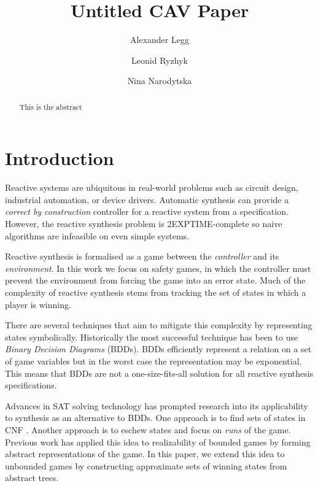 \documentclass{llncs}
\begin{document}
\title{Untitled CAV Paper}

\author{Alexander Legg 
    \and Leonid Ryzhyk
    \and Nina Narodytska}


\maketitle

\begin{abstract}
    This is the abstract
\end{abstract}

\section{Introduction}

Reactive systems are ubiquitous in real-world problems such as circuit design,
industrial automation, or device drivers. Automatic synthesis can provide a
\emph{correct by construction} controller for a reactive system from a
specification.  However, the reactive synthesis problem is 2EXPTIME-complete so
naive algorithms are infeasible on even simple systems.

Reactive synthesis is formalised as a game between the \emph{controller} and
its \emph{environment}. In this work we focus on safety games, in which the
controller must prevent the environment from forcing the game into an error
state.  Much of the complexity of reactive synthesis stems from tracking the
set of states in which a player is winning.

There are several techniques that aim to mitigate this complexity by
representing states symbolically.  Historically the most successful technique
has been to use \emph{Binary Decision Diagrams} (BDDs).  BDDs efficiently
represent a relation on a set of game variables but in the worst case the
representation may be exponential. This means that BDDs are not a
one-size-fits-all solution for all reactive synthesis specifications.

Advances in SAT solving technology has prompted research into its applicability
to synthesis as an alternative to BDDs. One approach is to find sets of states
in CNF \cite{demiurge}. Another approach is to eschew states and focus on
\emph{runs} of the game. Previous work has applied this idea to realizability
of bounded games \cite{narodytska2014} by forming abstract representations of
the game.  In this paper, we extend this idea to unbounded games by
constructing approximate sets of winning states from abstract trees.
\end{document}
